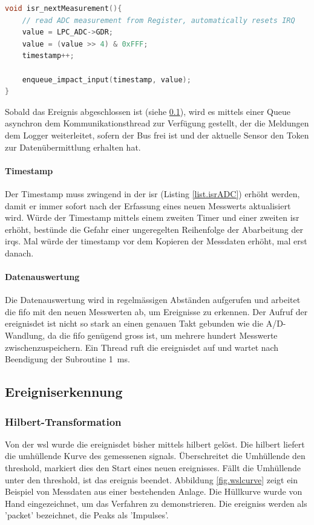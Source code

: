 \begin{lstlisting}[language=C,caption=ISR zur Abhandlung des ADC-Interrupt Requests (impact\_event.cpp), label=list.isrADC]
void isr_nextMeasurement(){
	// read ADC measurement from Register, automatically resets IRQ
	value = LPC_ADC->GDR;
	value = (value >> 4) & 0xFFF;
	timestamp++;
	
	enqueue_impact_input(timestamp, value);
}
\end{lstlisting}

Sobald das Ereignis abgeschlossen ist (siehe \ref{subsec.sw_ereignis}), wird es mittels einer Queue asynchron dem Kommunikationsthread zur Verfügung gestellt, der die Meldungen dem Logger weiterleitet, sofern der Bus frei ist und der aktuelle Sensor den Token zur Datenübermittlung erhalten hat.

\paragraph{Timestamp} Der Timestamp muss zwingend in der \gls{isr} (Listing \ref{list.isrADC}) erhöht werden, damit er immer sofort nach der Erfassung eines neuen Messwerts aktualisiert wird. Würde der Timestamp mittels einem zweiten Timer und einer zweiten \gls{isr} erhöht, bestünde die Gefahr einer ungeregelten Reihenfolge der Abarbeitung der \gls{irq}s. Mal würde der \gls{timestamp} vor dem Kopieren der Messdaten erhöht, mal erst danach.

\paragraph{Datenauswertung} Die Datenauswertung wird in regelmässigen Abständen aufgerufen und arbeitet die \gls{fifo} mit den neuen Messwerten ab, um Ereignisse zu erkennen. Der Aufruf der \gls{ereignisdet} ist nicht so stark an einen genauen Takt gebunden wie die A/D-Wandlung, da die \gls{fifo} genügend gross ist, um mehrere hundert Messwerte zwischenzuspeichern. Ein Thread ruft die \gls{ereignisdet} auf und wartet nach Beendigung der Subroutine 1~ms.

\subsection{Ereigniserkennung}\label{subsec.sw_ereignis}
\subsubsection{Hilbert-Transformation}
Von der \gls{wsl} wurde die \gls{ereignisdet} bisher mittels \gls{hilbert} gelöst. Die \gls{hilbert} liefert die umhüllende Kurve des gemessenen \gls{signal}s. Überschreitet die Umhüllende den \gls{threshold}, markiert dies den Start eines neuen \gls{ereignis}ses. Fällt die Umhüllende unter den \gls{threshold}, ist das \gls{ereignis} beendet. Abbildung \ref{fig.wslcurve} zeigt ein Beispiel von Messdaten aus einer bestehenden Anlage. Die Hüllkurve wurde von Hand eingezeichnet, um das Verfahren zu demonstrieren. Die \glspl{ereignis} werden als 'packet' bezeichnet, die Peaks als 'Impulses'.

